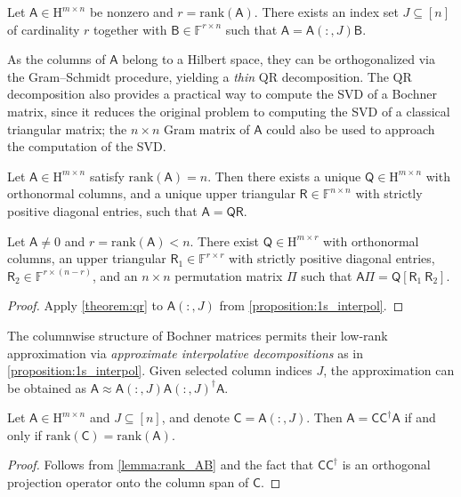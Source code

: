 \documentclass[onefignum,onetabnum]{siamart250211}
\newcommand{\F}{\mathbb{F}}
\newcommand{\Hilb}{\mathrm{H}}
\newcommand{\Batrix}[1]{\bm{\Matrix{#1}}}
\newcommand{\Matrix}[1]{\mathsf{#1}}
\newcommand{\pinv}{\dagger}
\newcommand{\rank}[2][]{\mathrm{rank} #1( #2 #1)}
\newcommand{\Index}[1]{{#1}}
\begin{document}
\begin{proposition}
\label{proposition:1s_interpol}
Let $\Batrix{A} \in \Hilb^{m \times n}$ be nonzero and $r = \rank{\Batrix{A}}$.
There exists an index set $\Index{J} \subseteq [n]$ of cardinality $r$ together with $\Matrix{B} \in \F^{r \times n}$ such that $\Batrix{A} = \Batrix{A}(:, \Index{J}) \Matrix{B}$.
\end{proposition}

As the columns of $\Batrix{A}$ belong to a Hilbert space, they can be orthogonalized via the Gram--Schmidt procedure, yielding a \emph{thin} QR decomposition.
The QR decomposition also provides a practical way to compute the SVD of a Bochner matrix, since it reduces the original problem to computing the SVD of a classical triangular matrix; the $n \times n$ Gram matrix of $\Batrix{A}$ could also be used to approach the computation of the SVD.

\begin{theorem}
\label{theorem:qr}
Let $\Batrix{A} \in \Hilb^{m \times n}$ satisfy $\rank{\Batrix{A}} = n$.
Then there exists a unique $\Batrix{Q} \in \Hilb^{m \times n}$ with orthonormal columns, and a unique upper triangular $\Matrix{R} \in \F^{n \times n}$ with strictly positive diagonal entries, such that $\Batrix{A} = \Batrix{Q} \Matrix{R}$.
\end{theorem}

\begin{corollary}
\label{corollary:qr_pivoted}
Let $\Batrix{A} \neq 0$ and $r = \rank{\Batrix{A}} < n$. 
There exist $\Batrix{Q} \in \Hilb^{m \times r}$ with orthonormal columns, an upper triangular $\Matrix{R}_1 \in \F^{r \times r}$ with strictly positive diagonal entries, $\Matrix{R}_2 \in \F^{r \times (n-r)}$, and an $n \times n$ permutation matrix $\Matrix{\Pi}$ such that $\Batrix{A}\Matrix{\Pi} = \Batrix{Q} [ \Matrix{R}_1~\Matrix{R}_2 ]$.
\end{corollary}
\begin{proof}
    Apply \cref{theorem:qr} to $\Batrix{A}(:, \Index{J})$ from \cref{proposition:1s_interpol}.
\end{proof}

The columnwise structure of Bochner matrices permits their low-rank approximation via \emph{approximate interpolative decompositions} as in \cref{proposition:1s_interpol}.
Given selected column indices $\Index{J}$, the approximation can be obtained as $\Batrix{A} \approx \Batrix{A}(:, \Index{J}) \Batrix{A}(:, \Index{J})^{\pinv} \Batrix{A}$.

\begin{proposition}
\label{proposition:cca_exact}
Let $\Batrix{A} \in \Hilb^{m \times n}$ and $\Index{J} \subseteq [n]$, and denote $\Batrix{C} = \Batrix{A}(:, \Index{J})$.
Then $\Batrix{A} = \Batrix{C} \Batrix{C}^{\pinv} \Batrix{A}$ if and only if $\rank{\Batrix{C}} = \rank{\Batrix{A}}$.
\end{proposition}
\begin{proof}
Follows from \cref{lemma:rank_AB} and the fact that $\Batrix{C} \Batrix{C}^{\pinv}$ is an orthogonal projection operator onto the column span of $\Batrix{C}$.
\end{proof}
\end{document}
